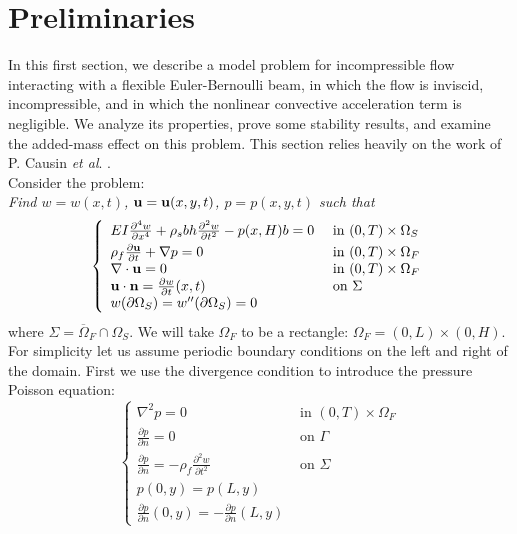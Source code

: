 \documentclass{article}
\begin{document}
\section{Preliminaries}
In this first section, we describe a model problem for incompressible flow interacting with a flexible Euler-Bernoulli beam, in which the flow is inviscid, incompressible, and in which the nonlinear convective acceleration term is negligible.
We analyze its properties,  prove some stability results, and examine the added-mass effect on this problem.
This section relies heavily on the work of P. Causin \emph{et al}. \cite{Causin2004}. \\
Consider the problem: \\
{\it Find $w = w(x,t)$, ${\bf u}={\bf u}(x,y,t)$, $p = p(x,y,t)$ such that }
\begin{equation} \left\{ \begin{array}{ll}
 EI\frac{\partial^4 w}{\partial x^4}+\rho_s b h \frac{\partial ^2 w}{\partial t^2}-p(x,H)b=0 & \text{ in } (0,T) \times \Omega_S \\[0.3em]
\rho_f \frac{\partial {\bf u}}{\partial t} + \nabla p = 0 &  \text{ in } (0,T) \times \Omega_F \\
\nabla \cdot {\bf u} = 0 &  \text{ in } (0,T) \times \Omega_F \\
{\bf u} \cdot {\bf n} = \frac{\partial w}{\partial t}(x,t) & \text{ on } \Sigma \\
w(\partial \Omega_S) = w''(\partial \Omega_S) = 0
\end{array} \right. \label{eq:eq2400} \end{equation}
where $\Sigma = \overline{\Omega}_F \cap \Omega_S$.
We will take $\Omega_F$ to be a rectangle: $\Omega_F = (0,L) \times (0,H)$.
For simplicity let us assume periodic boundary conditions on the left and right of the domain.
First we use the divergence condition to introduce the pressure Poisson equation:
\begin{equation} \left\{ \begin{array}{ll}
\nabla^2 p = 0  &  \text{ in } (0,T) \times \Omega_F \\
\frac{\partial p}{\partial n} = 0 &\text{ on } \Gamma \\
\frac{\partial p}{\partial n} = -\rho_f\frac{\partial^2 w}{\partial t^2} &\text{ on } \Sigma \\
p(0,y) = p(L,y) \\
\frac{\partial p}{\partial n}(0,y) =  -\frac{\partial p}{\partial n}(L,y)
\end{array} \right. \label{eq:eq2500} \end{equation}
\end{document}
